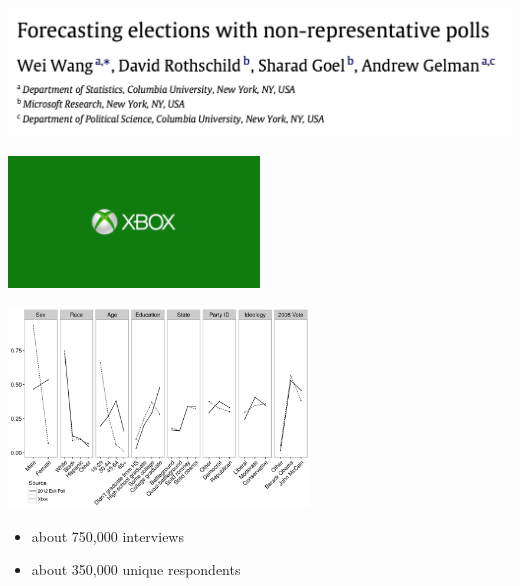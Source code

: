\documentclass[aspectratio=169]{beamer}
\begin{document}
\begin{frame}

\begin{center}
\includegraphics[width=\textwidth]{figures/wang_forecasting_2015_title}
\end{center}

\begin{center}
\includegraphics[width=0.5\textwidth]{figures/xboxlogo}
\end{center}

\end{frame}
\begin{frame}

\begin{center}
\includegraphics[width=0.6\textwidth]{figures/bitbybit3-7_wang_forecasting_2015_fig1}
\end{center}

\begin{itemize}
\item about 750,000 interviews
\item about 350,000 unique respondents
\end{itemize}

\end{frame}
\end{document}
